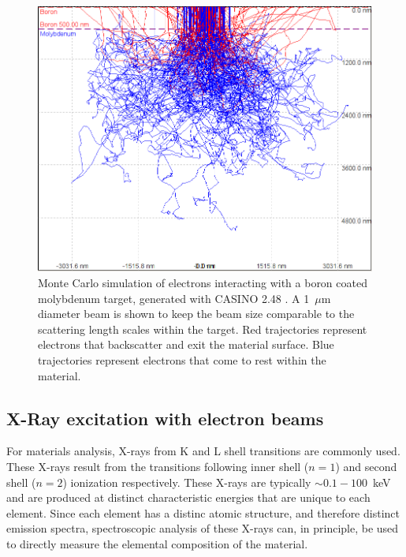\documentclass[12pt,letterpaper,final]{article}
\begin{document}
\begin{figure}[!h]
 \centering
  \includegraphics[width=\columnwidth]{figures/ElectronsInTargetWide.png}
 \caption{Monte Carlo simulation of electrons interacting with a boron coated molybdenum target, generated with CASINO 2.48 \cite{CASINO}. A 1~$\mu$m diameter beam is shown to keep the beam size comparable to the scattering length scales within the target. Red trajectories represent electrons that backscatter and exit the material surface. Blue trajectories represent electrons that come to rest within the material.}
\label{fig:ElectronsInTarget}
\end{figure}

\subsection{X-Ray excitation with electron beams}

For materials analysis, X-rays from K and L shell transitions are commonly used. These X-rays result from the transitions following inner shell ($n=1$) and second shell ($n=2$) ionization respectively. These X-rays are typically $\sim 0.1 - 100$~keV and are produced at distinct characteristic energies that are unique to each element. Since each element has a distinc atomic structure, and therefore distinct emission spectra, spectroscopic analysis of these X-rays can, in principle, be used to directly measure the elemental composition of the material.
\end{document}
